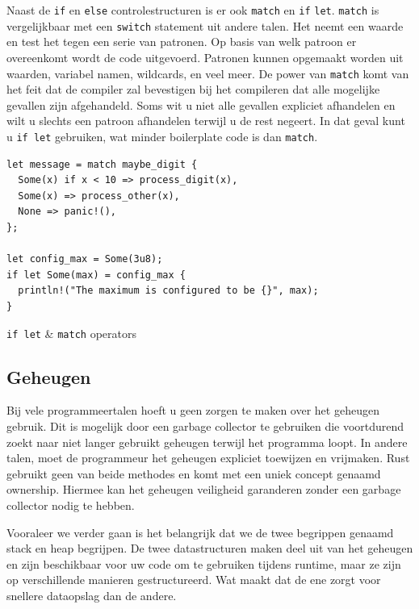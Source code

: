 Naast de \texttt{if} en \texttt{else} controlestructuren is er ook
\texttt{match} en \texttt{if} \texttt{let}. \texttt{match}
is vergelijkbaar met een \texttt{switch} statement uit andere talen. Het neemt een
waarde en test het tegen een serie van patronen. Op basis van welk patroon er overeenkomt wordt de
code uitgevoerd. Patronen kunnen opgemaakt worden uit waarden, variabel namen, wildcards, en veel
meer. De power van \texttt{match} komt van het feit dat de compiler zal bevestigen bij het
compileren dat alle mogelijke gevallen zijn afgehandeld. Soms wit u niet alle gevallen expliciet
afhandelen en wilt u slechts een patroon afhandelen terwijl u de rest negeert. In dat geval kunt u
\texttt{if let} gebruiken, wat minder boilerplate code is dan \texttt{match}.

\begin{listing}[h]
\begin{verbatim}
let message = match maybe_digit {
  Some(x) if x < 10 => process_digit(x),
  Some(x) => process_other(x),
  None => panic!(),
};

let config_max = Some(3u8);
if let Some(max) = config_max {
  println!("The maximum is configured to be {}", max);
}
\end{verbatim}
\caption{\texttt{if let} \& \texttt{match} operators}
\end{listing}

\clearpage

\subsection{Geheugen}

Bij vele programmeertalen hoeft u geen zorgen te maken over het geheugen gebruik. Dit is mogelijk
door een garbage collector te gebruiken die voortdurend zoekt naar niet langer gebruikt geheugen
terwijl het programma loopt. In andere talen, moet de programmeur het geheugen expliciet toewijzen
en vrijmaken. Rust gebruikt geen van beide methodes en komt met een uniek concept genaamd ownership.
Hiermee kan het geheugen veiligheid garanderen zonder een garbage collector nodig te hebben.
\cite{ownership}

Vooraleer we verder gaan is het belangrijk dat we de twee begrippen genaamd stack en heap begrijpen.
De twee datastructuren maken deel uit van het geheugen en zijn beschikbaar voor uw code om te
gebruiken tijdens runtime, maar ze zijn op verschillende manieren gestructureerd. Wat maakt dat de
ene zorgt voor snellere dataopslag dan de andere. 

